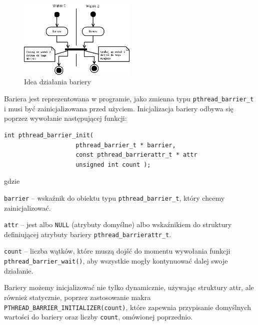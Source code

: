 \begin{figure}[!h]
\centering
\includegraphics[width=0.5\textwidth]{img/thrd_barrier}
\caption{Idea działania bariery}
\label{fig:thrd_barrier}
\end{figure}

Bariera jest reprezentowana w programie, jako zmienna typu \lstinline[style=MyCStyle]{pthread_barrier_t} i musi być zainicjalizowana przed użyciem. Inicjalizacja bariery odbywa się poprzez wywołanie następującej funkcji: 

\begin{lstlisting}[style=MyCStyle]
int pthread_barrier_init( 
                    pthread_barrier_t * barrier,
                    const pthread_barrierattr_t * attr
                    unsigned int count );

\end{lstlisting}

gdzie 

\begin{myitemize}
\item \lstinline[style=MyCStyle]{barrier} -- wskaźnik do obiektu typu \lstinline[style=MyCStyle]{pthread_barrier_t}, który chcemy zainicjalizować. 
\item \lstinline[style=MyCStyle]{attr} -- jest albo \lstinline[style=MyCStyle]{NULL} (atrybuty domyślne) albo wskaźnikiem do struktury definiującej atrybuty bariery \lstinline[style=MyCStyle]{pthread_barrierattr_t}.
\item \lstinline[style=MyCStyle]{count} -- liczba wątków, które muszą dojść do momentu wywołania funkcji \lstinline[style=MyCStyle]{pthread_barrier_wait()}, aby wszystkie mogły kontynuować dalej swoje działanie. 
\end{myitemize}

Bariery możemy inicjalizować nie tylko dynamicznie, używając struktury attr, ale również  statycznie, poprzez zastosowanie makra \lstinline[style=MyCStyle]{PTHREAD_BARRIER_INITIALIZER(count)}, które zapewnia przypisanie domyślnych wartości do bariery oraz liczby \lstinline[style=MyCStyle]{count}, omówionej poprzednio.

